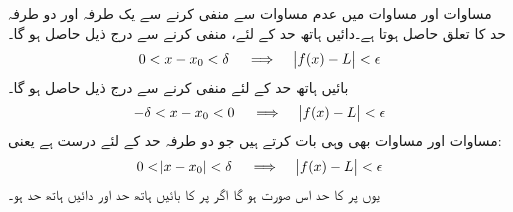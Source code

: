 مساوات  اور مساوات  میں  عدم مساوات سے  منفی کرنے سے یک طرفہ اور دو طرفہ حد کا تعلق حاصل ہوتا ہے۔دائیں ہاتھ حد کے لئے،  منفی کرنے سے درج ذیل حاصل ہو گا۔
\begin{align}\label{مساوات_حد_یک_طرفہ_الف}
0<x-x_0<\delta\quad \implies \quad \abs{f(x)-L}<\epsilon
\end{align}
بائیں ہاتھ حد کے لئے   منفی کرنے سے درج ذیل حاصل ہو گا۔
\begin{align}\label{مساوات_حد_یک_طرفہ_ب}
-\delta<x-x_0<0\quad \implies \quad \abs{f(x)-L}<\epsilon
\end{align}
مساوات  اور مساوات  بھی وہی بات کرتے ہیں جو دو طرفہ حد کے لئے درست ہے یعنی:
\begin{align}\label{مساوات_حد_یک_طرفہ_پ}
0<\abs{x-x_0}<\delta\quad \implies \quad \abs{f(x)-L}<\epsilon
\end{align}
یوں  پر  کا حد اس صورت  ہو گا اگر  پر  کا بائیں ہاتھ حد   اور دائیں ہاتھ حد  ہو۔

